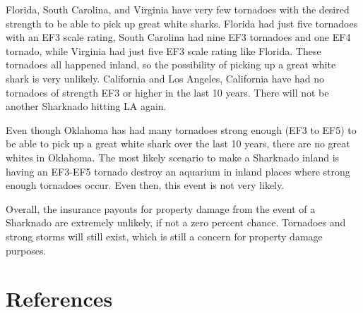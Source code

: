 \documentclass[
  letterpaper,
  DIV=11,
  numbers=noendperiod]{scrreprt}
\begin{document}
Florida, South Carolina, and Virginia have very few tornadoes with the
desired strength to be able to pick up great white sharks. Florida had
just five tornadoes with an EF3 scale rating, South Carolina had nine
EF3 tornadoes and one EF4 tornado, while Virginia had just five EF3
scale rating like Florida. These tornadoes all happened inland, so the
possibility of picking up a great white shark is very unlikely.
California and Los Angeles, California have had no tornadoes of strength
EF3 or higher in the last 10 years. There will not be another Sharknado
hitting LA again.

Even though Oklahoma has had many tornadoes strong enough (EF3 to EF5)
to be able to pick up a great white shark over the last 10 years, there
are no great whites in Oklahoma. The most likely scenario to make a
Sharknado inland is having an EF3-EF5 tornado destroy an aquarium in
inland places where strong enough tornadoes occur. Even then, this event
is not very likely.

Overall, the insurance payouts for property damage from the event of a
Sharknado are extremely unlikely, if not a zero percent chance.
Tornadoes and strong storms will still exist, which is still a concern
for property damage purposes.


\chapter*{References}\label{references}

\end{document}
